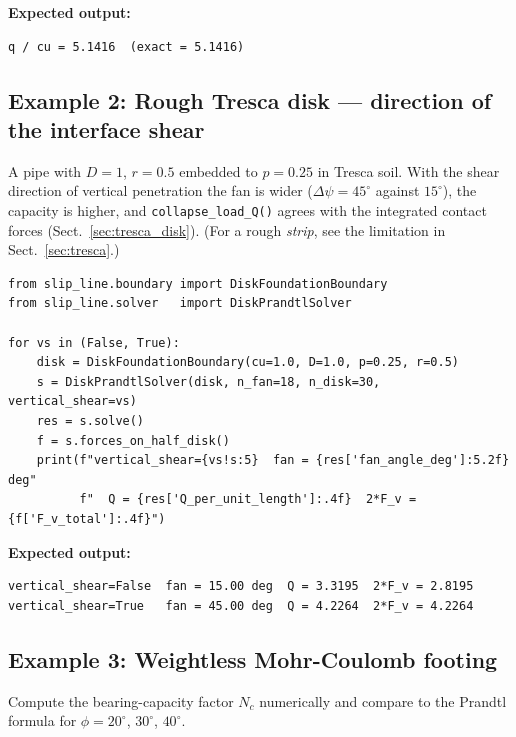 \documentclass[11pt,a4paper]{article}
\begin{document}
\textbf{Expected output:}
\begin{lstlisting}[numbers=none]
q / cu = 5.1416  (exact = 5.1416)
\end{lstlisting}

\subsection{Example 2: Rough Tresca disk — direction of the interface shear}
\label{ex:tresca_rough}

A pipe with $D = 1$, $r = 0.5$ embedded to $p = 0.25$ in Tresca soil.
With the shear direction of vertical penetration the fan is wider
($\Delta\psi = 45^\circ$ against $15^\circ$), the capacity is higher,
and \texttt{collapse\_load\_Q()} agrees with the integrated contact
forces (Sect.~\ref{sec:tresca_disk}).  (For a rough \emph{strip}, see
the limitation in Sect.~\ref{sec:tresca}.)

\begin{lstlisting}
from slip_line.boundary import DiskFoundationBoundary
from slip_line.solver   import DiskPrandtlSolver

for vs in (False, True):
    disk = DiskFoundationBoundary(cu=1.0, D=1.0, p=0.25, r=0.5)
    s = DiskPrandtlSolver(disk, n_fan=18, n_disk=30, vertical_shear=vs)
    res = s.solve()
    f = s.forces_on_half_disk()
    print(f"vertical_shear={vs!s:5}  fan = {res['fan_angle_deg']:5.2f} deg"
          f"  Q = {res['Q_per_unit_length']:.4f}  2*F_v = {f['F_v_total']:.4f}")
\end{lstlisting}

\textbf{Expected output:}
\begin{lstlisting}[numbers=none]
vertical_shear=False  fan = 15.00 deg  Q = 3.3195  2*F_v = 2.8195
vertical_shear=True   fan = 45.00 deg  Q = 4.2264  2*F_v = 4.2264
\end{lstlisting}

\subsection{Example 3: Weightless Mohr-Coulomb footing}
\label{ex:mc_weightless}

Compute the bearing-capacity factor $N_c$ numerically and compare to
the Prandtl formula for $\phi = 20^\circ$, $30^\circ$, $40^\circ$.
\end{document}
